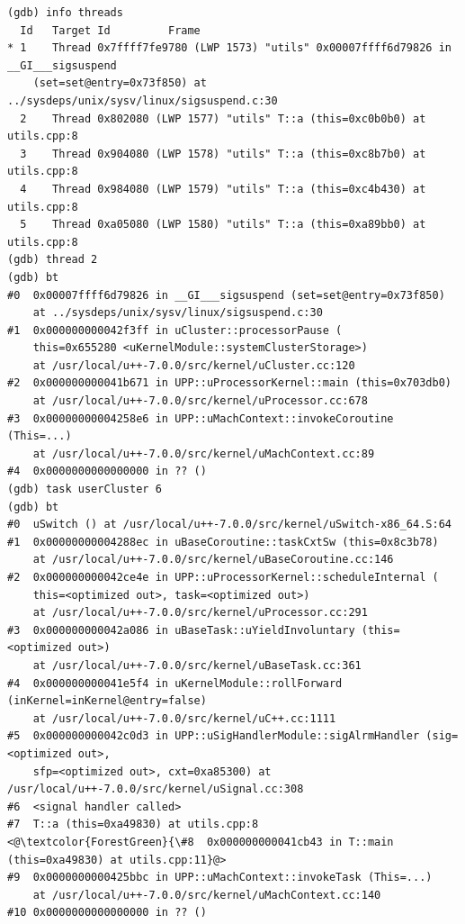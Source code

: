 \begin{lstlisting}[caption={Context switch version of task command}, label={pushtask-id}]
(gdb) info threads
  Id   Target Id         Frame
* 1    Thread 0x7ffff7fe9780 (LWP 1573) "utils" 0x00007ffff6d79826 in __GI___sigsuspend
    (set=set@entry=0x73f850) at ../sysdeps/unix/sysv/linux/sigsuspend.c:30
  2    Thread 0x802080 (LWP 1577) "utils" T::a (this=0xc0b0b0) at utils.cpp:8
  3    Thread 0x904080 (LWP 1578) "utils" T::a (this=0xc8b7b0) at utils.cpp:8
  4    Thread 0x984080 (LWP 1579) "utils" T::a (this=0xc4b430) at utils.cpp:8
  5    Thread 0xa05080 (LWP 1580) "utils" T::a (this=0xa89bb0) at utils.cpp:8
(gdb) thread 2
(gdb) bt
#0  0x00007ffff6d79826 in __GI___sigsuspend (set=set@entry=0x73f850)
    at ../sysdeps/unix/sysv/linux/sigsuspend.c:30
#1  0x000000000042f3ff in uCluster::processorPause (
    this=0x655280 <uKernelModule::systemClusterStorage>)
    at /usr/local/u++-7.0.0/src/kernel/uCluster.cc:120
#2  0x000000000041b671 in UPP::uProcessorKernel::main (this=0x703db0)
    at /usr/local/u++-7.0.0/src/kernel/uProcessor.cc:678
#3  0x00000000004258e6 in UPP::uMachContext::invokeCoroutine (This=...)
    at /usr/local/u++-7.0.0/src/kernel/uMachContext.cc:89
#4  0x0000000000000000 in ?? ()
(gdb) task userCluster 6
(gdb) bt
#0  uSwitch () at /usr/local/u++-7.0.0/src/kernel/uSwitch-x86_64.S:64
#1  0x00000000004288ec in uBaseCoroutine::taskCxtSw (this=0x8c3b78)
    at /usr/local/u++-7.0.0/src/kernel/uBaseCoroutine.cc:146
#2  0x000000000042ce4e in UPP::uProcessorKernel::scheduleInternal (
    this=<optimized out>, task=<optimized out>)
    at /usr/local/u++-7.0.0/src/kernel/uProcessor.cc:291
#3  0x000000000042a086 in uBaseTask::uYieldInvoluntary (this=<optimized out>)
    at /usr/local/u++-7.0.0/src/kernel/uBaseTask.cc:361
#4  0x000000000041e5f4 in uKernelModule::rollForward (inKernel=inKernel@entry=false)
    at /usr/local/u++-7.0.0/src/kernel/uC++.cc:1111
#5  0x000000000042c0d3 in UPP::uSigHandlerModule::sigAlrmHandler (sig=<optimized out>,
    sfp=<optimized out>, cxt=0xa85300) at /usr/local/u++-7.0.0/src/kernel/uSignal.cc:308
#6  <signal handler called>
#7  T::a (this=0xa49830) at utils.cpp:8
<@\textcolor{ForestGreen}{\#8  0x000000000041cb43 in T::main (this=0xa49830) at utils.cpp:11}@>
#9  0x0000000000425bbc in UPP::uMachContext::invokeTask (This=...)
    at /usr/local/u++-7.0.0/src/kernel/uMachContext.cc:140
#10 0x0000000000000000 in ?? ()
\end{lstlisting}

